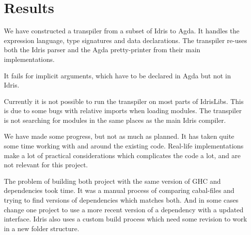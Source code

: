 \chapter{Results}




We have constructed a transpiler from a subset of Idris to Agda. It handles the
expression language, type signatures and data declarations.
The transpiler re-uses both the Idris parser and the Agda pretty-printer from
their main implementations.

It fails for implicit arguments, which have to be declared in Agda but not in
Idris.

Currently it is not possible to run the transpiler on most parts of IdrisLibs.
This is due to some bugs with relative imports when loading modules. The
transpiler is not searching for modules in the same places as the main Idris
compiler.

We have made some progress, but not as much as planned. It has taken quite some
time working with and around the existing code.  Real-life implementations make
a lot of practical considerations which complicates the code a lot, and are not
relevant for this project.


The problem of building both project with the same version of GHC and
dependencies took time. It was a manual process of comparing cabal-files and
trying to find versions of dependencies which matches both. And in some cases
change one project to use a more recent version of a dependency with a updated
interface. Idris also uses a custom build process which need some revision to
work in a new folder structure.


